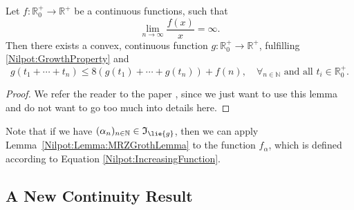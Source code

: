 \begin{lemma}
	\label{Nilpot:Lemma:MRZGrothLemma}
	Let $f\colon \mathbb{R}_0^+ \longrightarrow \mathbb{R}^+$ be a continuous 
	functions, such that
	\begin{equation}
		\label{Nilpot:GrowthProperty}
		\lim_{n \longrightarrow \infty}
		\frac{f(x)}{x}
		=
		\infty.
	\end{equation}
	Then there exists a convex, continuous function $g \colon \mathbb{R}_0^+ 
	\longrightarrow \mathbb{R}^+$, fulfilling \eqref{Nilpot:GrowthProperty} and
	\begin{equation}
		\label{Nilpot:SplittingProperty}
		g \left(
			t_1 + \cdots + t_n
		\right)
		\leq
		8 \left(
			g \left( t_1 \right)
			+ \cdots +
			g \left( t_n \right)
		\right)
		+
		f(n)
		, \quad
		\forall_{n \in \mathbb{N}}
		\text{ and all }
		t_i \in \mathbb{R}_0^+.
	\end{equation}
\end{lemma}
\begin{proof}
	We refer the reader to the paper \cite{mitiagin.rolewicz.zelazko:1962a},
	since we just want to use this lemma and do not want to go too much into
	details here.
\end{proof}
Note that if we have $(\alpha_n)_{n \in \mathbb{N}} \in \mathfrak{I}_{\lie{g}}$, 
then we can apply Lemma~\ref{Nilpot:Lemma:MRZGrothLemma} to 
the function $f_{\alpha}$, which is defined according to Equation 
\ref{Nilpot:IncreasingFunction}.



\subsection{A New Continuity Result}

